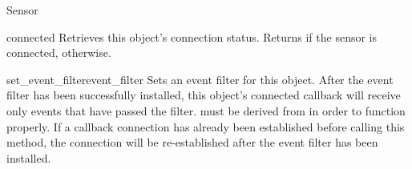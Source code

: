 \begin{classdesc*}{Sensor}
\begin{methoddesc}[Sensor]{connected}{}
Retrieves this  object's connection status.
Returns  if the sensor is connected,  otherwise.
\end{methoddesc}

\begin{methoddesc}[Sensor]{set_event_filter}{event_filter}
Sets an event filter for this  object. After the event filter has been
successfully installed, this  object's connected callback will
receive only events that have passed the filter.  must be derived
from  in order to function properly.
If a callback connection has already been established before calling this method,
the connection will be re-established after the event filter has been installed.
\end{methoddesc}

\end{classdesc*}

